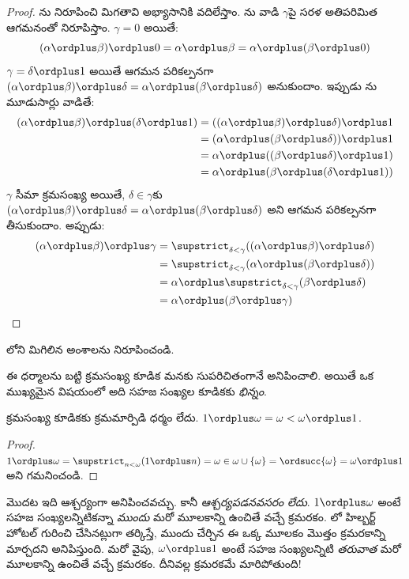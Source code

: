 \documentclass[../../../include/open-logic-section]{subfiles}
\begin{document}
\begin{proof}
ను నిరూపించి మిగతావి అభ్యాసానికి వదిలేస్తాం. ను వాడి $\gamma$పై సరళ అతిపరిమిత ఆగమనంతో నిరూపిస్తాం. $\gamma = 0$ అయితే:
\[
(\alpha \ordplus  \beta) \ordplus  0 = \alpha \ordplus  \beta  = \alpha \ordplus  (\beta \ordplus  0)
\]
$\gamma = \delta\ordplus 1$ అయితే ఆగమన పరికల్పనగా $(\alpha
\ordplus  \beta) \ordplus  \delta = \alpha \ordplus  (\beta \ordplus
\delta)$ అనుకుందాం. ఇప్పుడు ను మూడుసార్లు వాడితే:
\begin{align*}
	(\alpha \ordplus  \beta) \ordplus  (\delta \ordplus  1) & = ((\alpha \ordplus  \beta) \ordplus  \delta)\ordplus 1\\
	& = (\alpha \ordplus  (\beta \ordplus  \delta)) \ordplus  1\\
	& = \alpha \ordplus  ((\beta \ordplus  \delta)\ordplus 1)\\
	& = \alpha \ordplus  (\beta \ordplus  (\delta\ordplus 1))
\end{align*}
$\gamma$ సీమా క్రమసంఖ్య అయితే, $\delta \in \gamma$కు $(\alpha \ordplus  \beta) \ordplus  \delta =
\alpha \ordplus  (\beta \ordplus  \delta)$ అని ఆగమన పరికల్పనగా తీసుకుందాం. అప్పుడు:
\begin{align*}
	(\alpha \ordplus  \beta) \ordplus  \gamma & = \supstrict_{\delta < \gamma}((\alpha \ordplus  \beta) \ordplus  \delta) \\
	&= \supstrict_{\delta < \gamma}(\alpha \ordplus  (\beta \ordplus  \delta))\\
	&= \alpha \ordplus  \supstrict_{\delta < \gamma}(\beta \ordplus  \delta)\\
	& = \alpha \ordplus  (\beta \ordplus  \gamma)
\end{align*}
\end{proof}

\begin{prob}
లోని మిగిలిన అంశాలను నిరూపించండి.
\end{prob}

ఈ ధర్మాలను బట్టి క్రమసంఖ్య కూడిక మనకు సుపరిచితంగానే
అనిపించాలి. అయితే ఒక ముఖ్యమైన విషయంలో అది సహజ సంఖ్యల
కూడికకు \emph{భిన్నం}.

\begin{prop}
క్రమసంఖ్య కూడికకు {క్రమమార్పిడి ధర్మం లేదు}. $1 \ordplus  \omega = \omega <
\omega \ordplus  1$.
\end{prop}

\begin{proof}
$1 \ordplus  \omega = \supstrict_{n < \omega} (1 \ordplus n)
= \omega \in \omega \cup \{\omega\} = \ordsucc{\omega} = \omega
\ordplus  1$ అని గమనించండి.
\end{proof}
\noindent
మొదట ఇది ఆశ్చర్యంగా అనిపించవచ్చు. కానీ \emph{ఆశ్చర్యపడనవసరం లేదు}.
$1 \ordplus  \omega$ అంటే సహజ సంఖ్యలన్నిటికన్నా \emph{ముందు}
మరో మూలకాన్ని ఉంచితే వచ్చే క్రమరకం. లో
హిల్బర్ట్ హోటల్ గురించి చేసినట్లుగా తర్కిస్తే, ముందు చేర్చిన
ఈ ఒక్క మూలకం మొత్తం క్రమరకాన్ని మార్చదని అనిపిస్తుంది.
మరో వైపు, $\omega \ordplus  1$ అంటే సహజ సంఖ్యలన్నిటి
\emph{తరువాత} మరో మూలకాన్ని ఉంచితే వచ్చే క్రమరకం.
దీనివల్ల క్రమరకమే మారిపోతుంది!
\end{document}
